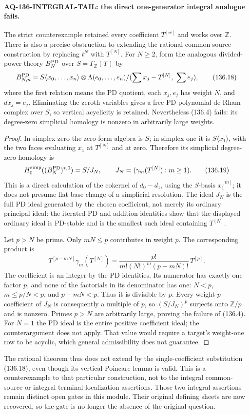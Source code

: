 \paragraph{AQ-136-INTEGRAL-TAIL: the direct one-generator integral analogue fails.}
The strict counterexample retained every coefficient
$T^{[w]}$ and works over $\mathbb Z$.  There is also a
precise obstruction to extending the rational common-source
construction by replacing $t^N$ with $T^{[N]}$.
For $N\geq2$, form the analogous divided-power theory
$B_N^{\rm PD}$ over $S=\Gamma_{\mathbb Z}(T)$ by
\[
 B_{N,n}^{\rm PD}
  =S\langle x_0,\ldots,x_n\rangle
       \otimes\Lambda(e_0,\ldots,e_n)
          /(\sum x_j-T^{[N]},\ \sum e_j),                   \tag{136.18}
\]
where the first relation means the PD quotient, each
$x_j,e_j$ has weight $N$, and $dx_j=e_j$.
Eliminating the zeroth variables gives a free PD
polynomial de Rham complex over $S$, so vertical
acyclicity is retained.  Nevertheless (136.4) fails:
its degree-zero simplicial homology is nonzero in
arbitrarily large weights.

\begin{proof}
In simplex zero the zero-form algebra is $S$; in
simplex one it is $S\langle x_1\rangle$, with the two
faces evaluating $x_1$ at $T^{[N]}$ and at zero.
Therefore its simplicial degree-zero homology is
\[
 H_0^{\rm simp}((B_N^{\rm PD})^{*,0})=S/J_N,
 \qquad J_N=(\gamma_m(T^{[N]}):m\geq1).                    \tag{136.19}
\]
This is a direct calculation of the cokernel of
$d_0-d_1$, using the $S$-basis $x_1^{[m]}$; it does
not presume flat base change of a simplicial
resolution.  The ideal $J_N$ is the full PD ideal
generated by the chosen coefficient, not merely
its ordinary principal ideal: the iterated-PD and
addition identities show that the displayed
ordinary ideal is PD-stable and is the smallest
such ideal containing $T^{[N]}$.

Let $p>N$ be prime.  Only $mN\leq p$ contributes
in weight $p$.  The corresponding product is
\[
 T^{[p-mN]}\gamma_m(T^{[N]})
   =\frac{p!}{m!(N!)^m(p-mN)!}\,T^{[p]}.                   \tag{136.20}
\]
The coefficient is an integer by the PD identities.
Its numerator has exactly one factor $p$, and
none of the factorials in its denominator has
one: $N<p$, $m\leq p/N<p$, and $p-mN<p$.
Thus it is divisible by $p$.
Every weight-$p$ coefficient of $J_N$ is consequently
a multiple of $p$, so $(S/J_N)^p$ surjects onto
$\mathbb Z/p$ and is nonzero.  Primes $p>N$ are
arbitrarily large, proving the failure of (136.4).
For $N=1$ the PD ideal is the entire positive
coefficient ideal; the counterargument does not
apply.  That value would require a target's
weight-one row to be acyclic, which general
admissibility does not guarantee.
\end{proof}

The rational theorem thus does not extend by the
single-coefficient substitution (136.18), even
though its vertical Poincare lemma is valid.
This is a counterexample to that particular
construction, not to the integral common-source
or integral terminal-localization assertions.
Those two integral assertions remain distinct
open gates in this module.  Their original
defining sheets are now recovered, so the gate
is no longer the absence of the original question.
